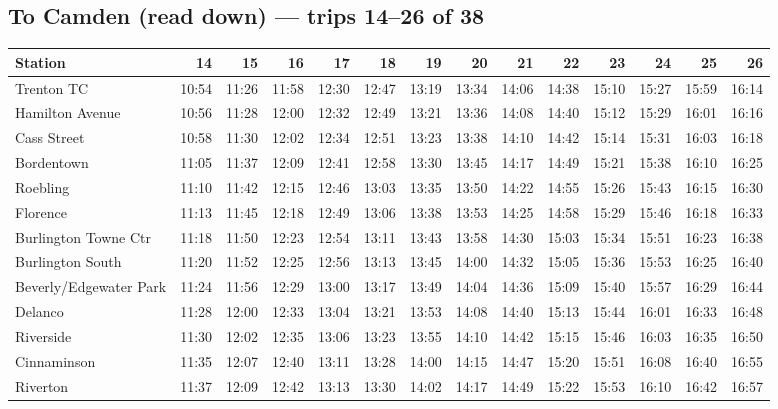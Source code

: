 \subsection*{To Camden (read down) --- trips 14--26 of 38}
\begin{center}\footnotesize\setlength{\tabcolsep}{3pt}\begin{tabular}{@{}lrrrrrrrrrrrrr@{}}\toprule
Station & 14 & 15 & 16 & 17 & 18 & 19 & 20 & 21 & 22 & 23 & 24 & 25 & 26 \\\midrule
Trenton TC & 10:54 & 11:26 & 11:58 & 12:30 & 12:47 & 13:19 & 13:34 & 14:06 & 14:38 & 15:10 & 15:27 & 15:59 & 16:14 \\
Hamilton Avenue & 10:56 & 11:28 & 12:00 & 12:32 & 12:49 & 13:21 & 13:36 & 14:08 & 14:40 & 15:12 & 15:29 & 16:01 & 16:16 \\
Cass Street & 10:58 & 11:30 & 12:02 & 12:34 & 12:51 & 13:23 & 13:38 & 14:10 & 14:42 & 15:14 & 15:31 & 16:03 & 16:18 \\
Bordentown & 11:05 & 11:37 & 12:09 & 12:41 & 12:58 & 13:30 & 13:45 & 14:17 & 14:49 & 15:21 & 15:38 & 16:10 & 16:25 \\
Roebling & 11:10 & 11:42 & 12:15 & 12:46 & 13:03 & 13:35 & 13:50 & 14:22 & 14:55 & 15:26 & 15:43 & 16:15 & 16:30 \\
Florence & 11:13 & 11:45 & 12:18 & 12:49 & 13:06 & 13:38 & 13:53 & 14:25 & 14:58 & 15:29 & 15:46 & 16:18 & 16:33 \\
Burlington Towne Ctr & 11:18 & 11:50 & 12:23 & 12:54 & 13:11 & 13:43 & 13:58 & 14:30 & 15:03 & 15:34 & 15:51 & 16:23 & 16:38 \\
Burlington South & 11:20 & 11:52 & 12:25 & 12:56 & 13:13 & 13:45 & 14:00 & 14:32 & 15:05 & 15:36 & 15:53 & 16:25 & 16:40 \\
Beverly/Edgewater Park & 11:24 & 11:56 & 12:29 & 13:00 & 13:17 & 13:49 & 14:04 & 14:36 & 15:09 & 15:40 & 15:57 & 16:29 & 16:44 \\
Delanco & 11:28 & 12:00 & 12:33 & 13:04 & 13:21 & 13:53 & 14:08 & 14:40 & 15:13 & 15:44 & 16:01 & 16:33 & 16:48 \\
Riverside & 11:30 & 12:02 & 12:35 & 13:06 & 13:23 & 13:55 & 14:10 & 14:42 & 15:15 & 15:46 & 16:03 & 16:35 & 16:50 \\
Cinnaminson & 11:35 & 12:07 & 12:40 & 13:11 & 13:28 & 14:00 & 14:15 & 14:47 & 15:20 & 15:51 & 16:08 & 16:40 & 16:55 \\
Riverton & 11:37 & 12:09 & 12:42 & 13:13 & 13:30 & 14:02 & 14:17 & 14:49 & 15:22 & 15:53 & 16:10 & 16:42 & 16:57 \\

\end{tabular}
\end{center}
